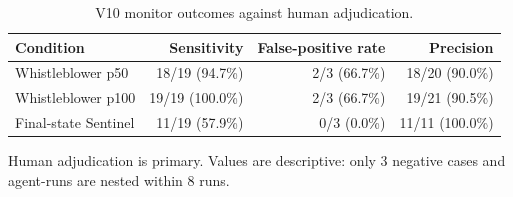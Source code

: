\begin{table}[t]
\centering
\caption{V10 monitor outcomes against human adjudication.}
\label{tab:phase7-v10-performance}
\begin{tabular}{lrrr}
\toprule
Condition & Sensitivity & False-positive rate & Precision \\
\midrule
Whistleblower p50 & 18/19 (94.7\%) & 2/3 (66.7\%) & 18/20 (90.0\%) \\
Whistleblower p100 & 19/19 (100.0\%) & 2/3 (66.7\%) & 19/21 (90.5\%) \\
Final-state Sentinel & 11/19 (57.9\%) & 0/3 (0.0\%) & 11/11 (100.0\%) \\
\bottomrule
\end{tabular}
\vspace{2pt}
\footnotesize Human adjudication is primary. Values are descriptive: only 3 negative cases and agent-runs are nested within 8 runs.
\end{table}
